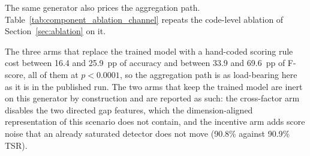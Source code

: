 \documentclass[notspecified,article,submit,moreauthors]{Definitions/mdpi}
\begin{document}
The same generator also prices the aggregation path. Table~\ref{tab:component_ablation_channel} repeats the code-level ablation of Section~\ref{sec:ablation} on it.

The three arms that replace the trained model with a hand-coded scoring rule cost between 16.4 and 25.9~pp of accuracy and between 33.9 and 69.6~pp of F-score, all of them at $p<0.0001$, so the aggregation path is as load-bearing here as it is in the published run. The two arms that keep the trained model are inert on this generator by construction and are reported as such: the cross-factor arm disables the two directed gap features, which the dimension-aligned representation of this scenario does not contain, and the incentive arm adds score noise that an already saturated detector does not move (90.8\% against 90.9\% TSR).
\end{document}
